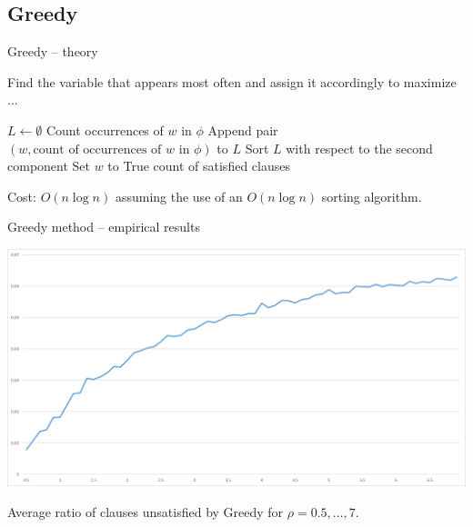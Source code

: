 \documentclass[aspectratio=169, compress, xcolor=table,xcolor=dvipsnames]{beamer}
\begin{document}
\subsection{Greedy}

\begin{frame}
{Greedy -- theory}

Find the variable that appears most often and assign it accordingly to maximize ...


\begin{algorithmic}[1]\sffamily
	\State $L \gets \emptyset$
		\State Count occurrences of $w$ in $\phi$
		\State Append pair $(w, \text{count of occurrences of $w$ in $\phi$})$ to $L$
	\EndFor
	\State Sort $L$ with respect to the second component
		\State Set $w$ to True 
	\EndFor
	\State \Return count of satisfied clauses
\end{algorithmic}

\vfill

Cost: $O(n\log n)$ assuming the use of an $O(n\log n)$ sorting algorithm.
\end{frame}

\begin{frame}
{Greedy method -- empirical results}
\begin{center}
	\includegraphics[width=\textwidth]{img/greedy}
\end{center}

Average ratio of clauses unsatisfied by Greedy for $\rho=0.5,\ldots,7$.
\end{frame}
\end{document}
